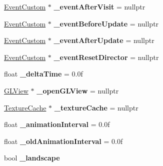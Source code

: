 \begin{DoxyCompactItemize}
\item 
\mbox{\label{classDirector_aeb3c2b28483903697ca76c584ebc7c13}} 
\hyperlink{classEventCustom}{Event\+Custom} $\ast$ {\bfseries \+\_\+event\+After\+Visit} = nullptr
\item 
\mbox{\label{classDirector_a323005b9f2d6d2dc07d05ababcac0486}} 
\hyperlink{classEventCustom}{Event\+Custom} $\ast$ {\bfseries \+\_\+event\+Before\+Update} = nullptr
\item 
\mbox{\label{classDirector_a2fa413e516a9e684c7cfa735942a7699}} 
\hyperlink{classEventCustom}{Event\+Custom} $\ast$ {\bfseries \+\_\+event\+After\+Update} = nullptr
\item 
\mbox{\label{classDirector_a2b4c03a038609db92a661319640034c4}} 
\hyperlink{classEventCustom}{Event\+Custom} $\ast$ {\bfseries \+\_\+event\+Reset\+Director} = nullptr
\item 
\mbox{\label{classDirector_a0337a18ec46eecbc048a03fb9cdb38d8}} 
float {\bfseries \+\_\+delta\+Time} = 0.\+0f
\item 
\mbox{\label{classDirector_a29d5b5ff73396011d6688aea4722ac5b}} 
\hyperlink{classGLView}{G\+L\+View} $\ast$ {\bfseries \+\_\+open\+G\+L\+View} = nullptr
\item 
\mbox{\label{classDirector_aa371a38b0ee29d36b688427f0817ff67}} 
\hyperlink{classTextureCache}{Texture\+Cache} $\ast$ {\bfseries \+\_\+texture\+Cache} = nullptr
\item 
\mbox{\label{classDirector_a50320fd21396b404874caab78d7eaaaf}} 
float {\bfseries \+\_\+animation\+Interval} = 0.\+0f
\item 
\mbox{\label{classDirector_a96b8cddbdaa506a06a7cf3f02f6e782c}} 
float {\bfseries \+\_\+old\+Animation\+Interval} = 0.\+0f
\item 
\mbox{\label{classDirector_a6fd4659f5420b1bd242957472f62f9df}} 
bool {\bfseries \+\_\+landscape}
\item 
\mbox{\label{classDirector_a51fb5eac10c8b203125688e727798720}} 

\end{DoxyCompactItemize}
